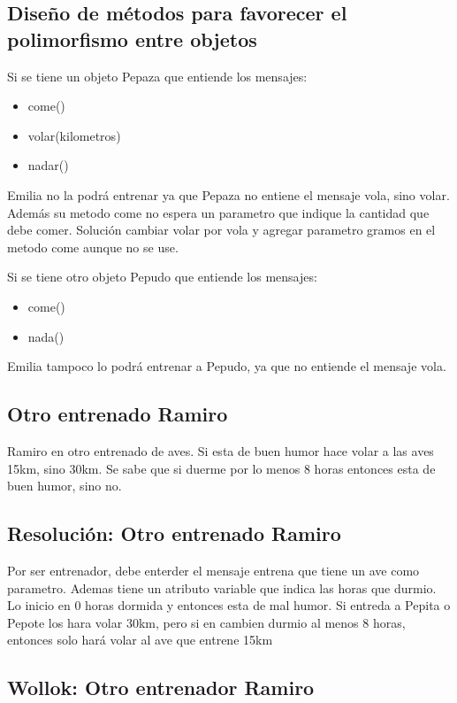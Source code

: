 \documentclass[11pt,a4paper]{article}
\begin{document}
\subsection{Diseño de métodos para favorecer el polimorfismo entre objetos}

Si se tiene un objeto Pepaza que entiende los mensajes:

\begin{itemize}
	\item come()
	\item volar(kilometros)
	\item nadar()
\end{itemize}

Emilia no la podrá entrenar ya que 	Pepaza no entiene el mensaje vola, sino volar. Además su metodo come no espera un parametro que indique la cantidad que debe comer.
Solución cambiar volar por vola y agregar parametro gramos en el metodo come aunque no se use.

Si se tiene otro objeto Pepudo que entiende los mensajes:

\begin{itemize}
	\item come()
	\item nada()
\end{itemize}

Emilia tampoco lo podrá entrenar a Pepudo, ya que no entiende el mensaje vola. 

\subsection{Otro entrenado Ramiro}
Ramiro en otro entrenado de aves. Si esta de buen humor hace volar a las aves 15km, sino 30km. Se sabe que si duerme por lo menos 8 horas entonces esta de buen humor, sino no.
\subsection{Resolución: Otro entrenado Ramiro}
Por ser entrenador, debe enterder el mensaje entrena que tiene un ave como parametro. Ademas tiene un atributo variable que indica las horas que durmio. Lo inicio en 0 horas dormida y entonces esta de mal humor. Si entreda a Pepita o Pepote los hara volar 30km, pero si en cambien durmio al menos 8 horas, entonces solo hará volar al ave que entrene 15km

\subsection{Wollok: Otro entrenador Ramiro}

\end{document}
